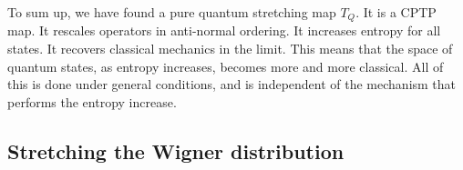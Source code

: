 \documentclass{article}
\begin{document}
To sum up, we have found a pure quantum stretching map $T_Q$. It is a CPTP map. It rescales operators in anti-normal ordering. It increases entropy for all states. It recovers classical mechanics in the limit. This means that the space of quantum states, as entropy increases, becomes more and more classical. All of this is done under general conditions, and is independent of the mechanism that performs the entropy increase.





\subsection{Stretching the Wigner distribution}
\end{document}
